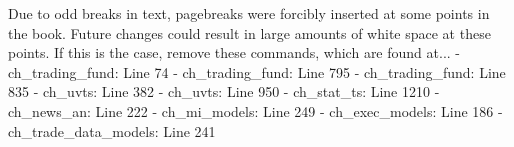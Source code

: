 Due to odd breaks in text, pagebreaks were forcibly inserted at some points in the book. Future changes could result in large amounts of white space at these points. If this is the case, remove these commands, which are found at...
- ch_trading_fund: Line 74
- ch_trading_fund: Line 795
- ch_trading_fund: Line 835
- ch_uvts: Line 382
- ch_uvts: Line 950
- ch_stat_ts: Line 1210
- ch_news_an: Line 222
- ch_mi_models: Line 249
- ch_exec_models: Line 186
- ch_trade_data_models: Line 241